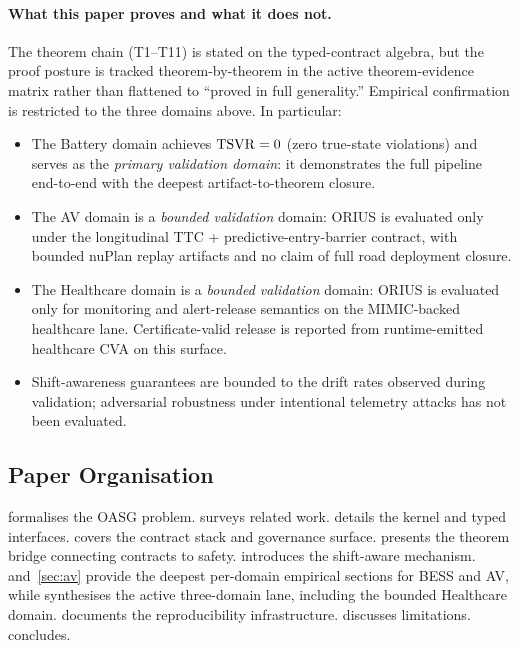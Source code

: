 \paragraph{What this paper proves and what it does not.}
The theorem chain (T1--T11) is stated on the typed-contract algebra, but the
proof posture is tracked theorem-by-theorem in the active theorem-evidence matrix
rather than flattened to ``proved in full generality.'' Empirical confirmation
is restricted to the three domains above.  In
particular:
\begin{itemize}[nosep]
  \item The Battery domain achieves $\mathrm{TSVR} = 0$ (zero true-state violations) and
        serves as the \emph{primary validation domain}: it demonstrates the full pipeline
        end-to-end with the deepest artifact-to-theorem closure.
  \item The AV domain is a \emph{bounded validation} domain: ORIUS is evaluated only
        under the longitudinal TTC + predictive-entry-barrier contract, with bounded
        nuPlan replay artifacts and no claim of full road deployment closure.
  \item The Healthcare domain is a \emph{bounded validation} domain: ORIUS is evaluated
        only for monitoring and alert-release semantics on the MIMIC-backed healthcare lane.
        Certificate-valid release is reported from runtime-emitted healthcare CVA on this surface.
  \item Shift-awareness guarantees are bounded to the drift rates observed during
        validation; adversarial robustness under intentional telemetry attacks has
        not been evaluated.
\end{itemize}

\subsection{Paper Organisation}

 formalises the OASG problem.   surveys related
work.   details the \dcs{} kernel and typed interfaces.
 covers the contract stack and governance surface.
 presents the theorem bridge connecting contracts to safety.
 introduces the shift-aware mechanism.  
and~\cref{sec:av} provide the deepest per-domain empirical sections for BESS and AV,
while  synthesises the active three-domain lane, including the
bounded Healthcare domain.
 documents the reproducibility infrastructure.
 discusses limitations.   concludes.
